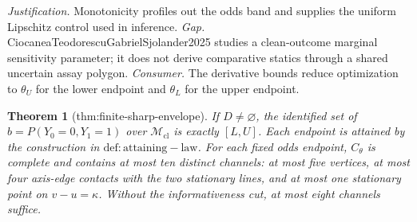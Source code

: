 \documentclass{article}
\newtheorem{theorem}{Theorem}
\begin{document}
\par\smallskip\noindent \textit{Justification.} Monotonicity profiles out the odds band and supplies the uniform Lipschitz control used in inference. \textit{Gap.} CiocaneaTeodorescuGabrielSjolander2025 studies a clean-outcome marginal sensitivity parameter; it does not derive comparative statics through a shared uncertain assay polygon. \textit{Consumer.} The derivative bounds reduce optimization to \(\theta_U\) for the lower endpoint and \(\theta_L\) for the upper endpoint.

\begin{theorem}[thm:finite-sharp-envelope]\label{thm:finite-sharp-envelope}
If \(D\neq\varnothing\), the identified set of \(b=P(Y_0=0,Y_1=1)\) over \(\mathcal M_{\mathrm{cl}}\) is exactly \([L,U]\). Each endpoint is attained by the construction in \(\mathrm{def:attaining-law}\). For each fixed odds endpoint, \(C_{\theta}\) is complete and contains at most ten distinct channels: at most five vertices, at most four axis-edge contacts with the two stationary lines, and at most one stationary point on \(v-u=\kappa\). Without the informativeness cut, at most eight channels suffice.
\end{theorem}
\end{document}
